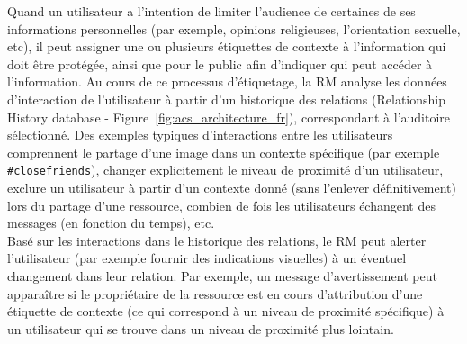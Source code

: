 Quand un utilisateur a l'intention de limiter l'audience de certaines de ses informations personnelles (par exemple, opinions religieuses, l'orientation sexuelle, etc), il peut assigner une ou plusieurs étiquettes de contexte à l'information qui doit être protégée, ainsi que pour le public afin d'indiquer qui peut accéder à l'information. Au cours de ce processus d'étiquetage, la RM analyse les données d'interaction de l'utilisateur à partir d'un historique des relations (Relationship History database - Figure~\ref{fig:acs_architecture_fr}), correspondant à l'auditoire sélectionné. Des exemples typiques d'interactions entre les utilisateurs comprennent le partage d'une image dans un contexte spécifique (par exemple \verb+#closefriends+), changer explicitement le niveau de proximité d'un utilisateur, exclure un utilisateur à partir d'un contexte donné (sans l'enlever définitivement) lors du partage d'une ressource, combien de fois les utilisateurs échangent des messages (en fonction du temps), etc.\\


Basé sur les interactions dans le historique des relations, le RM peut alerter l'utilisateur (par exemple fournir des indications visuelles) à un éventuel changement dans leur relation. Par exemple, un message d'avertissement peut apparaître si le propriétaire de la ressource est en cours d'attribution d'une étiquette de contexte (ce qui correspond à un niveau de proximité spécifique) à un utilisateur qui se trouve dans un niveau de proximité plus lointain.\\


